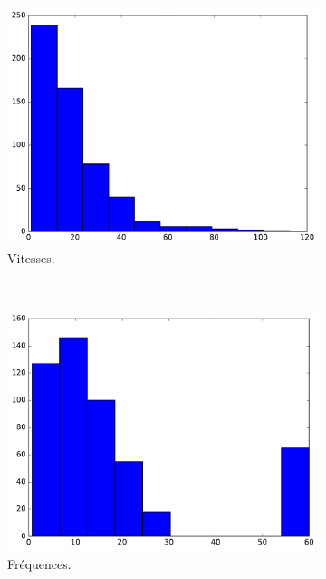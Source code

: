 	\begin{figure}[!htbp]
		\begin{subfigure}[t]{\subImgWclicks}
			\centering
			\includegraphics[width=\textwidth]{figures/ch3/chinaA_filteredSpeed}
			\caption{Vitesses.}
			\label{fig:chinaA_filteredSpeed}
		\end{subfigure}
		~
		\begin{subfigure}[t]{\subImgWclicks}
			\centering
			\includegraphics[width=\textwidth]{figures/ch3/chinaA_frequency}
			\caption{Fréquences.}
			\label{fig:chinaA_frequency}
		\end{subfigure}
		~
		\begin{subfigure}[t]{\subImgWclicks}

\end{subfigure}
\end{figure}
